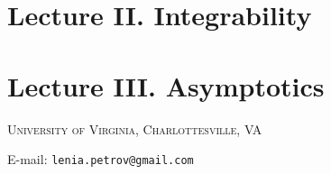 \documentclass[letterpaper,11pt,oneside,reqno]{article}
\numberwithin{equation}{section}
\theoremstyle{definition}
\theoremstyle{remark}
\begin{document}
\newpage
\section{Lecture II. Integrability}
\label{sec:integrability}





\newpage
\section{Lecture III. Asymptotics}
\label{sec:asymptotics}







\newpage



\medskip

\textsc{University of Virginia, Charlottesville, VA}

E-mail: \texttt{lenia.petrov@gmail.com}
\end{document}
